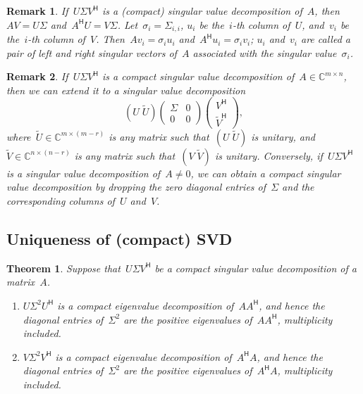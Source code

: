 \documentclass[11pt,a4paper]{article}  %
\numberwithin{equation}{section}
\newtheorem{theorem}{Theorem}%
\newtheorem{remark}{Remark}%
\theoremstyle{definition}
\def\CC{\mathbb{C}}
\newcommand{\hmt}{{\scriptscriptstyle{{\mathsf{H}}}}}
\begin{document}
\begin{remark}
If~$U\Sigma V^\hmt$ is a \textnormal{(}compact\textnormal{)} singular value decomposition
of~$A$, then~$AV = U\Sigma$ and~$A^\hmt U = V\Sigma$.
Let~$\sigma_i=\Sigma_{i,i}$, $u_i$ be the~$i$-th column of~$U$,
and~$v_i$ be the~$i$-th column of~$V$.
Then~$A v_i = \sigma_i u_i$ and~$A^\hmt u_i = \sigma_i v_i$; $u_i$ and~$v_i$
are called a pair of left and right singular vectors of~$A$ associated with the
singular value~$\sigma_{i}$.
\end{remark}

\begin{remark}
  If~$U \Sigma V^\hmt$ is a compact singular value decomposition of~$A \in \CC^{m\times n}$,
  then we can extend it to a singular value decomposition
  \begin{equation*}
    (U \; \tilde{U})
    \begin{pmatrix}
      \Sigma & 0\\
      0 & 0
    \end{pmatrix}
    \begin{pmatrix}
      V^\hmt\\
      \tilde{V}^\hmt
    \end{pmatrix},
  \end{equation*}
  where~$\tilde{U}\in \CC^{m\times(m-r)}$ is any matrix such that~$(U \; \tilde{U})$ is unitary,
  and~$\tilde{V} \in \CC^{n\times (n-r)}$ is any matrix such that~$(V \; \tilde{V})$ is unitary.
  Conversely, if~$U\Sigma V^\hmt$ is a singular value decomposition of~$A\neq 0$, we can obtain a compact
  singular value decomposition by dropping the zero diagonal entries of~$\Sigma$ and the
  corresponding columns of~$U$ and~$V$.
\end{remark}


\subsection{Uniqueness of (compact) SVD}

\begin{theorem}
 Suppose that~$U\Sigma V^\hmt$ be a compact singular value decomposition of a matrix~$A$.
 \begin{enumerate}[leftmargin=1.5em]
   \item $U\Sigma^2 U^\hmt$ is a compact eigenvalue decomposition of~$AA^\hmt$,
     and hence the diagonal entries of~$\Sigma^2$ are the positive eigenvalues of~$AA^\hmt$, multiplicity included.
   \item $V\Sigma^2 V^\hmt$ is a compact eigenvalue decomposition of~$A^\hmt A$,
     and hence the diagonal entries of~$\Sigma^2$ are the positive eigenvalues of~$A^\hmt A$, multiplicity included.
 \end{enumerate}
\end{theorem}
\end{document}
